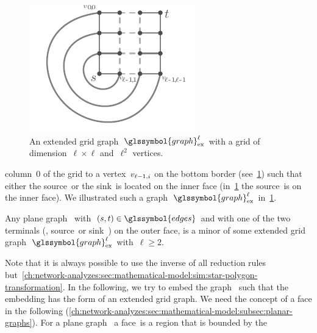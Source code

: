 \begin{figure}%
    \vspace*{-0.75cm}
    \includegraphics[scale=1,page=1]{networkAnalyzes/figures/ExtendedGridGraph.pdf}
    \caption[An extended grid graph.]{%
        An extended grid graph~$\glssymbol{graph}_{\mathrm{ex}}^\ell$ with
        a grid of dimension~$\ell\times\ell$ and~$\ell^2$ vertices.
        \vspace*{-1.0cm}
    }%
    \label{ch:network-analysis:fig:extended-grid-graph}%
\end{figure}%
% 
\noindent column~$0$ of the grid to a vertex~$v_{\ell-1,i}$ on the bottom
border (see~\cref{ch:network-analysis:fig:extended-grid-graph}) such that either
the source~\source or the sink~\sink is located on the inner face
(in~\cref{ch:network-analysis:fig:extended-grid-graph} the source~\source is on
the inner face). We illustrated such a
graph~$\glssymbol{graph}_{\mathrm{ex}}^\ell$
in~\cref{ch:network-analysis:fig:extended-grid-graph}.
% 
\begin{lemma}
    Any plane graph~ with~$(\source,\sink)\in\glssymbol{edges}$
    and with one of the two terminals (\ie, source~\source or sink~\sink) on the
    outer face, is a minor of some extended grid
    graph~$\glssymbol{graph}_{\mathrm{ex}}^\ell$ with~$\ell \geq 2$.
    \label{ch:network-analyzes:sec:mathematical-model:lem:plane-graph-grid-graphs}
\end{lemma}
% 
Note that it is always possible to use the inverse of all reduction rules
but~\cref{ch:network-analyzes:sec:mathematical-model:sim:star-polygon-transformation}.
In the following, we try to embed the graph~ such that the
embedding has the form of an extended grid graph. We need the concept of a face
in the following
(\cref{ch:network-analyzes:sec:mathematical-model:subsec:planar-graphs}). For a
plane graph~ a face~\cycle is a region that is bounded by the
